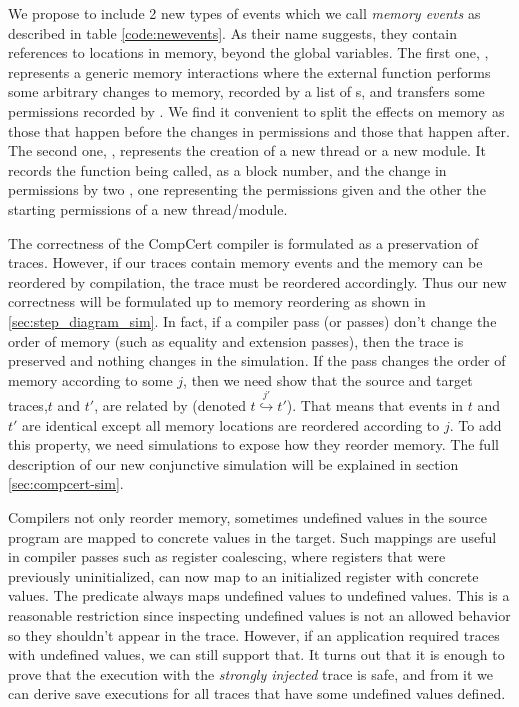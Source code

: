 We propose to include 2 new types of events which we call \emph{memory events} as described in table \ref{code:newevents}. As their name suggests, they contain references to locations in memory, beyond the global variables.  
The first one, , represents a generic memory interactions where the external function performs some arbitrary changes to memory, recorded by a list of s, and transfers some permissions recorded by . We find it convenient to split the effects on memory as those that happen before the changes in permissions and those that happen after. 
The second one,  , represents the creation of a new thread or a new module. It records the function being called, as a block number, and the change in permissions by two , one representing the permissions given and the other the starting permissions of a new thread/module.

The correctness of the CompCert compiler is formulated as a preservation of traces. However, if our traces contain memory events and the memory can be reordered by compilation, the trace must be reordered accordingly. Thus our new correctness will be formulated up to memory reordering as shown in \ref{sec:step_diagram_sim}. In fact, if a compiler pass (or passes) don't change the order of memory (such as equality and extension passes), then the trace is preserved and nothing changes in the simulation. If the pass changes the order of memory according to some $j$, then we need show that the source and target traces,$t$ and $t'$, are related by  (denoted $t \overset{j'}{\hookrightarrow} t'$). That means that events in $t$ and $t'$ are identical except all memory locations are reordered according to $j$. To add this property, we need simulations to expose how they reorder memory. The full description of our new conjunctive simulation will be explained in section \ref{sec:compcert-sim}.


Compilers not only reorder memory, sometimes undefined values in the source program are mapped to concrete values in the target. Such mappings are useful in compiler passes such as register coalescing, where registers that were previously uninitialized, can now map to an initialized register with concrete values. The predicate  always maps undefined values to undefined values. This is a reasonable restriction since inspecting undefined values is not an allowed behavior so they shouldn't appear in the trace. However, if an application required traces with undefined values, we can still support that. It turns out that it is enough to prove that the execution with the \emph{strongly injected} trace is safe, and from it we can derive save executions for all traces that have some undefined values defined.
